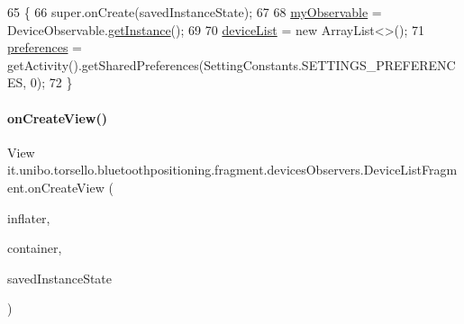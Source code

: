 \begin{DoxyCode}
65                                                               \{
66         super.onCreate(savedInstanceState);
67 
68         \hyperlink{classit_1_1unibo_1_1torsello_1_1bluetoothpositioning_1_1fragment_1_1devicesObservers_1_1DeviceListFragment_a437b28a367ed0f3f5f26e7994b10675d_a437b28a367ed0f3f5f26e7994b10675d}{myObservable} = DeviceObservable.\hyperlink{classit_1_1unibo_1_1torsello_1_1bluetoothpositioning_1_1observables_1_1DeviceObservable_ab16792c5848440646624b2a41553954a_ab16792c5848440646624b2a41553954a}{getInstance}();
69 
70         \hyperlink{classit_1_1unibo_1_1torsello_1_1bluetoothpositioning_1_1fragment_1_1devicesObservers_1_1DeviceListFragment_ad728f2e256af2d4acf05d3cf900f3ad4_ad728f2e256af2d4acf05d3cf900f3ad4}{deviceList} = \textcolor{keyword}{new} ArrayList<>();
71         \hyperlink{classit_1_1unibo_1_1torsello_1_1bluetoothpositioning_1_1fragment_1_1devicesObservers_1_1DeviceListFragment_ac2b5a8b56dc71b8a217dbc37515e2052_ac2b5a8b56dc71b8a217dbc37515e2052}{preferences} = getActivity().getSharedPreferences(SettingConstants.SETTINGS\_PREFERENCES, 
      0);
72     \}
\end{DoxyCode}
\hypertarget{classit_1_1unibo_1_1torsello_1_1bluetoothpositioning_1_1fragment_1_1devicesObservers_1_1DeviceListFragment_a7897dd7ea0239d171ec620f65607cc3a_a7897dd7ea0239d171ec620f65607cc3a}{}\label{classit_1_1unibo_1_1torsello_1_1bluetoothpositioning_1_1fragment_1_1devicesObservers_1_1DeviceListFragment_a7897dd7ea0239d171ec620f65607cc3a_a7897dd7ea0239d171ec620f65607cc3a} 
\paragraph{\texorpdfstring{on\+Create\+View()}{onCreateView()}}
{\footnotesize\ttfamily View it.\+unibo.\+torsello.\+bluetoothpositioning.\+fragment.\+devices\+Observers.\+Device\+List\+Fragment.\+on\+Create\+View (\begin{DoxyParamCaption}\item[{Layout\+Inflater}]{inflater,  }\item[{View\+Group}]{container,  }\item[{Bundle}]{saved\+Instance\+State }\end{DoxyParamCaption})}


